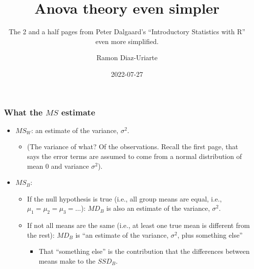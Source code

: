 \documentclass[bigger]{beamer}
\author{Ramon Diaz-Uriarte}
\date{2022-07-27}
\title{Anova theory even simpler}
\subtitle{The 2 and a half pages from Peter Dalgaard's ``Introductory Statistics with R'' even more simplified.}
\begin{document}
 \maketitle


  




\begin{frame}
  \frametitle{What the $MS$ estimate}
  \begin{itemize}
  \item $MS_W$: an estimate of the variance, $\sigma^2$.
    \begin{itemize}
    \item {\tiny (The variance of what? Of the observations. Recall the
        first page, that says the error terms are assumed to come from a normal
        distribution of mean 0 and variance $\sigma^2$).}
    \end{itemize}

    \vspace*{20pt}
  \item $MS_B$:
    \begin{itemize}
    \item If the null hypothesis is true (i.e., all group means are equal, i.e.,
      $\mu_1 = \mu_2 = \mu_3 = \ldots$): $MD_B$ is also an estimate of the variance,
      $\sigma^2$.
          \vspace*{10pt}
    \item If not all means are the same (i.e., at least one true mean is
      different from the rest):  $MD_B$ is ``an estimate of the
      variance, $\sigma^2$, plus something else''
      \begin{itemize}
      \item That ``something else'' is the contribution that the differences
        between means make to the $SSD_B$. 
      \end{itemize}
    \end{itemize}
  \end{itemize}
\end{frame}
\end{document}
